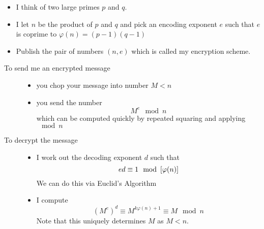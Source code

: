 \documentclass{article}
\begin{document}
\begin{defi}\leavevmode
    \begin{itemize}
        \item I think of two large primes $p$ and $q$.
        \item I let $n$ be the product of $p$ and $q$ and pick an encoding exponent $e$ such that $e$ is coprime to $\varphi(n) = (p-1)(q-1)$
        \item Publish the pair of numbers $(n, e)$ which is called my encryption scheme.
    \end{itemize}
\end{defi}

\begin{description}
    \item[To send me an encrypted message]\leavevmode
    \begin{itemize}
        \item you chop your message into number $M < n$
        \item you send the number
        \[
            M^e \mod n  
        \]
        which can be computed quickly by repeated squaring and applying $\mod n$
    \end{itemize}
    
    \item[To decrypt the message]\leavevmode
    \begin{itemize}
        \item I work out the decoding exponent $d$ such that
        \[
            ed \equiv 1 \mod \sqbkt{\varphi(n)} 
        \]
        We can do this via Euclid's Algorithm
        \item I compute
        \[
            (M^e)^d \equiv M^{k \varphi(n) + 1} \equiv M \mod n 
        \]
        Note that this uniquely determines $M$ as $M < n$.
    \end{itemize}
\end{description}
\end{document}
